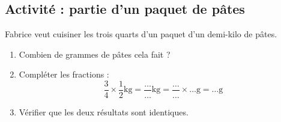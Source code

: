 
\subsection*{Activité : partie d'un paquet de pâtes}

Fabrice veut cuisiner les trois quarts d'un paquet d'un demi-kilo de pâtes.
\begin{enumerate}
    \item
        Combien de grammes de pâtes cela fait ?
    \item
        Compléter les fractions :
        \begin{equation}
            \frac{ 3 }{ 4 }\times \frac{1}{ 2 }\si{\kilo\gram}=\frac{ \ldots }{ \ldots }\si{\kilo\gram}=\frac{ \ldots }{ \ldots }\times\ldots\si{\gram}=\ldots\si{\gram}
        \end{equation}
    \item
        Vérifier que les deux résultats sont identiques.
\end{enumerate}
